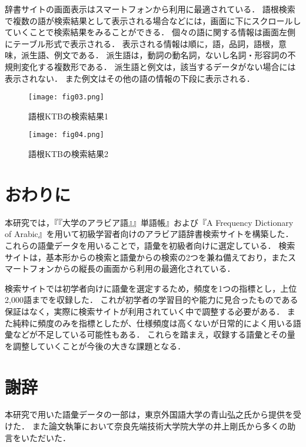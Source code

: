 \documentclass[technicalreport]{ieicej}
\begin{document}
辞書サイトの画面表示はスマートフォンから利用に最適されている．
語根検索で複数の語が検索結果として表示される場合などには，画面に下にスクロールしていくことで検索結果をみることができる．
個々の語に関する情報は画面左側にテーブル形式で表示される．
表示される情報は順に，語，品詞，語根，意味，派生語、例文である．
派生語は，動詞の動名詞，ないし名詞・形容詞の不規則変化する複数形である．
派生語と例文は，該当するデータがない場合には表示されない．
また例文はその他の語の情報の下段に表示される．

\begin{figure}[H]
 \begin{minipage}{0.5\hsize}
  \begin{center}
   \texttt{[image: fig03.png]}
  \end{center}
  \caption{語根KTBの検索結果1}
 \end{minipage}
 \begin{minipage}{0.5\hsize}
  \begin{center}
   \texttt{[image: fig04.png]}
  \end{center}
  \caption{語根KTBの検索結果2}
 \end{minipage}
\end{figure}

\section{おわりに}
本研究では，『『大学のアラビア語』』単語帳』および『A Frequency Dictionary of Arabic』を用いて初級学習者向けのアラビア語辞書検索サイトを構築した．
これらの語彙データを用いることで，語彙を初級者向けに選定している．
検索サイトは，基本形からの検索と語彙からの検索の2つを兼ね備えており，またスマートフォンからの縦長の画面から利用の最適化されている．

検索サイトでは初学者向けに語彙を選定するため，頻度を1つの指標とし，上位2,000語までを収録した．
これが初学者の学習目的や能力に見合ったものである保証はなく，実際に検索サイトが利用されていく中で調整する必要がある．
また純粋に頻度のみを指標としたが、仕様頻度は高くないが日常的によく用いる語彙などが不足している可能性もある．
これらを踏まえ，収録する語彙とその量を調整していくことが今後の大きな課題となる．

\section{謝辞}
本研究で用いた語彙データの一部は，東京外国語大学の青山弘之氏から提供を受けた．
また論文執筆において奈良先端技術大学院大学の井上剛氏から多くの助言をいただいた．
\end{document}
